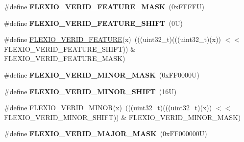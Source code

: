 \begin{DoxyCompactItemize}
\item 
\mbox{\label{group___f_l_e_x_i_o___register___masks_ga006b544043a2c26d8efd9b0c7e9aa3fa}} 
\#define {\bfseries F\+L\+E\+X\+I\+O\+\_\+\+V\+E\+R\+I\+D\+\_\+\+F\+E\+A\+T\+U\+R\+E\+\_\+\+M\+A\+SK}~(0x\+F\+F\+F\+F\+U)
\item 
\mbox{\label{group___f_l_e_x_i_o___register___masks_gad3c2c0272fe08a5be8fca8fdcfc5f8d6}} 
\#define {\bfseries F\+L\+E\+X\+I\+O\+\_\+\+V\+E\+R\+I\+D\+\_\+\+F\+E\+A\+T\+U\+R\+E\+\_\+\+S\+H\+I\+FT}~(0\+U)
\item 
\#define \mbox{\hyperlink{group___f_l_e_x_i_o___register___masks_gab1437e53add5efd4514c59bf0c5809d5}{F\+L\+E\+X\+I\+O\+\_\+\+V\+E\+R\+I\+D\+\_\+\+F\+E\+A\+T\+U\+RE}}(x)~(((uint32\+\_\+t)(((uint32\+\_\+t)(x)) $<$$<$ F\+L\+E\+X\+I\+O\+\_\+\+V\+E\+R\+I\+D\+\_\+\+F\+E\+A\+T\+U\+R\+E\+\_\+\+S\+H\+I\+FT)) \& F\+L\+E\+X\+I\+O\+\_\+\+V\+E\+R\+I\+D\+\_\+\+F\+E\+A\+T\+U\+R\+E\+\_\+\+M\+A\+SK)
\item 
\mbox{\label{group___f_l_e_x_i_o___register___masks_gab592179bf9e62be34436924d2d0bad80}} 
\#define {\bfseries F\+L\+E\+X\+I\+O\+\_\+\+V\+E\+R\+I\+D\+\_\+\+M\+I\+N\+O\+R\+\_\+\+M\+A\+SK}~(0x\+F\+F0000\+U)
\item 
\mbox{\label{group___f_l_e_x_i_o___register___masks_gadfea85fbf2ecea10cdc273f80defeb92}} 
\#define {\bfseries F\+L\+E\+X\+I\+O\+\_\+\+V\+E\+R\+I\+D\+\_\+\+M\+I\+N\+O\+R\+\_\+\+S\+H\+I\+FT}~(16\+U)
\item 
\#define \mbox{\hyperlink{group___f_l_e_x_i_o___register___masks_ga8d7e5d04f1f52aeb18e6d445c8819c5f}{F\+L\+E\+X\+I\+O\+\_\+\+V\+E\+R\+I\+D\+\_\+\+M\+I\+N\+OR}}(x)~(((uint32\+\_\+t)(((uint32\+\_\+t)(x)) $<$$<$ F\+L\+E\+X\+I\+O\+\_\+\+V\+E\+R\+I\+D\+\_\+\+M\+I\+N\+O\+R\+\_\+\+S\+H\+I\+FT)) \& F\+L\+E\+X\+I\+O\+\_\+\+V\+E\+R\+I\+D\+\_\+\+M\+I\+N\+O\+R\+\_\+\+M\+A\+SK)
\item 
\mbox{\label{group___f_l_e_x_i_o___register___masks_ga363340e849ba9907bb30959c3dde0074}} 
\#define {\bfseries F\+L\+E\+X\+I\+O\+\_\+\+V\+E\+R\+I\+D\+\_\+\+M\+A\+J\+O\+R\+\_\+\+M\+A\+SK}~(0x\+F\+F000000\+U)

\end{DoxyCompactItemize}
